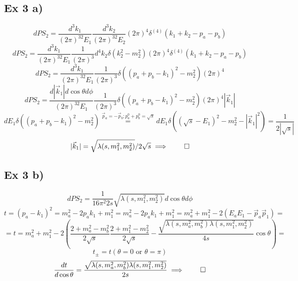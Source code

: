 \documentclass{article}
\begin{document}
\subsection*{Ex 3 a)}
\begin{equation}
dPS_2  = \frac{d^3k_1}{(2\pi)^32E_1}\frac{d^3k_2}{(2\pi)^32E_2} (2 \pi)^4 \delta^{(4)} (k_1 + k_2 -p_a - p _b)
\end{equation}
\begin{equation}
dPS_2  = \frac{d^3k_1}{(2\pi)^32E_1}\frac{1}{(2\pi)^3} d^4k_2 \delta(k_2^2-m_2^2) (2 \pi)^4 \delta^{(4)} (k_1 + k_2 -p_a - p _b)
\end{equation}
\begin{equation}
dPS_2  = \frac{d^3k_1}{(2\pi)^32E_1}\frac{1}{(2\pi)^3} \delta((p_a+p_b - k_1)^2-m_2^2) (2 \pi)^4
\end{equation}
\begin{equation}
dPS_2  = \frac{d|\vec k_1|d \cos \theta d \phi}{(2\pi)^32E_1}\frac{1}{(2\pi)^3} \delta((p_a+p_b - k_1)^2-m_2^2) (2 \pi)^4 |\vec k_1|
\end{equation}
\begin{equation}
 dE_1 \delta((p_a+p_b - k_1)^2-m_2^2) \overset{\vec p_a = -\vec p_b; p_a^0+p_b^0 = \sqrt{s}}{=}  dE_1 \delta((\sqrt{s} - E_1)^2-m_2^2 - |\vec k_1|^2) = \frac{1}{2|\sqrt{s}|}
\end{equation}
\begin{equation}
 |\vec k_1| = \sqrt{\lambda(s,m_1^2,m_2^2)}/2\sqrt{s} \implies \qed
\end{equation}
\subsection*{Ex 3 b)}
\begin{equation}
dPS_2 = \frac{1}{16\pi^2 2 s}  \sqrt{\lambda(s,m_1^2,m_2^2)} d \cos \theta d \phi 
\end{equation}
\begin{equation}
t = (p_a-k_1)^2 = m_a^2 -2 p_ak_1 + m_1^2 = m_a^2 -2 p_ak_1 + m_1^2 = m_a^2 + m_1^2 - 2(E_aE_1 - \vec p_a\vec p_1 ) =
\end{equation}
\begin{equation}
=t = m_a^2 + m_1^2 - 2(\frac{2+m_a^2-m_b^2}{2\sqrt s} \frac{2+m_1^2-m_2^2}{2\sqrt s} - \frac{ \sqrt{\lambda(s,m_a^2,m_b^2)\lambda(s,m_1^2,m_2^2)} }{4s} \cos \theta)=
\end{equation}
\begin{equation}
t_\pm = t(\theta = 0 \text{ or } \theta=\pi) 
\end{equation}
\begin{equation}
\frac{dt}{d \cos \theta} = \frac{ \sqrt{\lambda(s,m_a^2,m_b^2)\lambda(s,m_1^2,m_2^2)} }{2s} \implies \qed
\end{equation}
\end{document}
